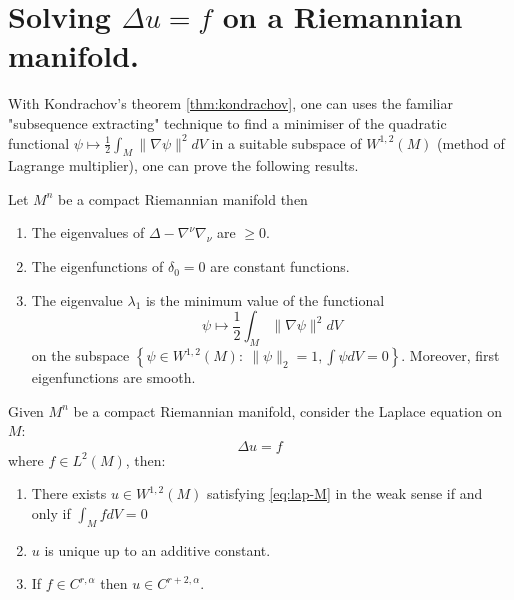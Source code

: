 \section{Solving \(\Delta u = f\) on a Riemannian manifold.}
\label{sec:orgad038eb}
With Kondrachov's theorem \ref{thm:kondrachov}, one can uses the familiar "subsequence
extracting" technique to find a minimiser of the quadratic functional
\(\psi \mapsto \frac{1}{2}\int_M \|\nabla\psi\|^2 dV\) in a suitable subspace of
\(W^{1,2}(M)\) (method of Lagrange multiplier), one can prove the following results.

\begin{theorem}
\label{thm:spec-lap}
Let \(M^n\) be a compact Riemannian manifold then
\begin{enumerate}
\item The eigenvalues of \(\Delta - \nabla^\nu\nabla_\nu\) are \(\geq 0\).
\item The eigenfunctions of \(\delta_0=0\) are constant functions.
\item The eigenvalue \(\lambda_1\) is the minimum value of the functional
\[
    \psi \mapsto \frac{1}{2}\int_M \|\nabla\psi\|^2 dV
   \]
 on the subspace \(\left\{\psi \in W^{1,2}(M): \ \|\psi\|_2 = 1,\int\psi dV=0 \right\}\).
Moreover, first eigenfunctions are smooth.
\end{enumerate}
\end{theorem}


\begin{theorem}
\label{thm:lap-l2}
Given \(M^n\) be a compact Riemannian manifold, consider the Laplace equation on \(M\):
\begin{equation}
\label{eq:lap-M}
\Delta u = f	
\end{equation}
where \(f\in L^2(M)\), then:
\begin{enumerate}
\item There exists \(u\in W^{1,2}(M)\) satisfying \eqref{eq:lap-M} in the weak sense if and only if \(\int_M f
   dV = 0\)
\item \(u\) is unique up to an additive constant.
\item If \(f\in C^{r,\alpha}\) then \(u\in C^{r+2,\alpha}\).
\end{enumerate}
\end{theorem}
